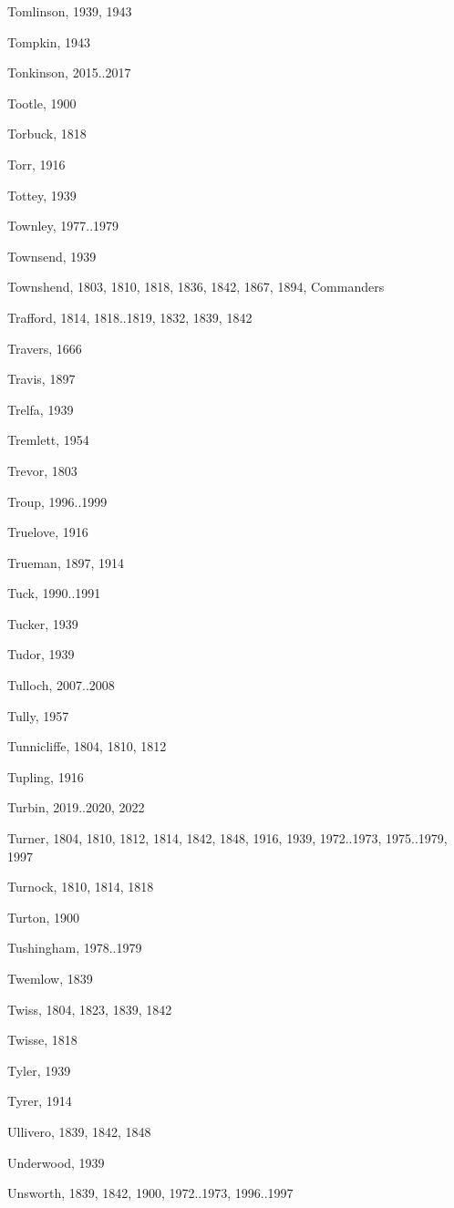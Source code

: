 \begin{theindex}
\item Tomlinson, 1939, 1943
\item Tompkin, 1943
\item Tonkinson, 2015..2017
\item Tootle, 1900
\item Torbuck, 1818
\item Torr, 1916
\item Tottey, 1939
\item Townley, 1977..1979
\item Townsend, 1939
\item Townshend, 1803, 1810, 1818, 1836, 1842, 1867, 1894, Commanders
\item Trafford, 1814, 1818..1819, 1832, 1839, 1842
\item Travers, 1666
\item Travis, 1897
\item Trelfa, 1939
\item Tremlett, 1954
\item Trevor, 1803
\item Troup, 1996..1999
\item Truelove, 1916
\item Trueman, 1897, 1914
\item Tuck, 1990..1991
\item Tucker, 1939
\item Tudor, 1939
\item Tulloch, 2007..2008
\item Tully, 1957
\item Tunnicliffe, 1804, 1810, 1812
\item Tupling, 1916
\item Turbin, 2019..2020, 2022
\item Turner, 1804, 1810, 1812, 1814, 1842, 1848, 1916, 1939, 1972..1973, 1975..1979, 1997
\item Turnock, 1810, 1814, 1818
\item Turton, 1900
\item Tushingham, 1978..1979
\item Twemlow, 1839
\item Twiss, 1804, 1823, 1839, 1842
\item Twisse, 1818
\item Tyler, 1939
\item Tyrer, 1914
\item Ullivero, 1839, 1842, 1848
\item Underwood, 1939
\item Unsworth, 1839, 1842, 1900, 1972..1973, 1996..1997

\end{theindex}
